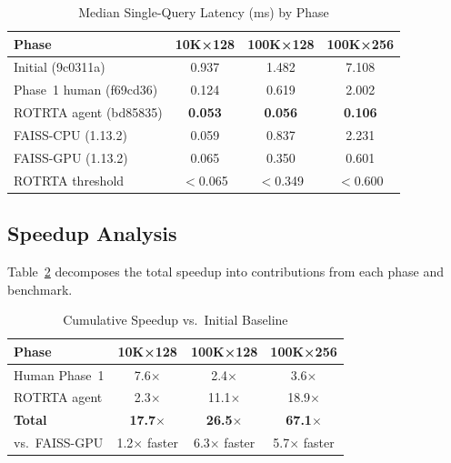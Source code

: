 \documentclass[conference]{IEEEtran}
\begin{document}
\begin{table}[htbp]
  \caption{Median Single-Query Latency (ms) by Phase}
  \label{tab:perf}
  \centering
  \renewcommand{\arraystretch}{1.15}
  \setlength{\tabcolsep}{4pt}
  \begin{tabular}{lccc}
    \toprule
    \textbf{Phase} & \textbf{10K×128} & \textbf{100K×128} & \textbf{100K×256} \\
    \midrule
    Initial (9c0311a)         & 0.937 & 1.482 & 7.108 \\
    Phase~1 human (f69cd36)   & 0.124 & 0.619 & 2.002 \\
    ROTRTA agent (bd85835)    & \textbf{0.053} & \textbf{0.056} & \textbf{0.106} \\
    \midrule
    FAISS-CPU (1.13.2)        & 0.059 & 0.837 & 2.231 \\
    FAISS-GPU (1.13.2)        & 0.065 & 0.350 & 0.601 \\
    \midrule
    ROTRTA threshold          & $<$0.065 & $<$0.349 & $<$0.600 \\
    \bottomrule
  \end{tabular}
\end{table}

\subsection{Speedup Analysis}

Table~\ref{tab:speedup} decomposes the total speedup into contributions
from each phase and benchmark.

\begin{table}[htbp]
  \caption{Cumulative Speedup vs.\ Initial Baseline}
  \label{tab:speedup}
  \centering
  \renewcommand{\arraystretch}{1.15}
  \begin{tabular}{lccc}
    \toprule
    \textbf{Phase} & \textbf{10K×128} & \textbf{100K×128} & \textbf{100K×256} \\
    \midrule
    Human Phase~1             & 7.6$\times$ & 2.4$\times$ & 3.6$\times$ \\
    ROTRTA agent              & 2.3$\times$ & 11.1$\times$ & 18.9$\times$ \\
    \midrule
    \textbf{Total}            & \textbf{17.7}$\times$ & \textbf{26.5}$\times$ & \textbf{67.1}$\times$ \\
    \midrule
    vs.\ FAISS-GPU            & 1.2$\times$ faster & 6.3$\times$ faster & 5.7$\times$ faster \\
    \bottomrule
  \end{tabular}
\end{table}
\end{document}
